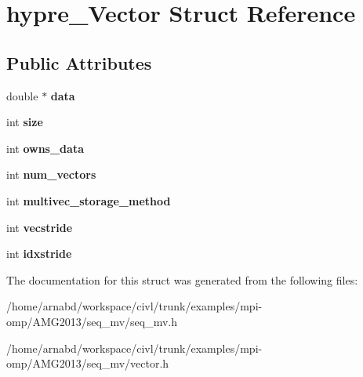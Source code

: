 \hypertarget{structhypre__Vector}{}\section{hypre\+\_\+\+Vector Struct Reference}
\label{structhypre__Vector}
\subsection*{Public Attributes}
\begin{DoxyCompactItemize}
\item 
\hypertarget{structhypre__Vector_a08359b553570ec654f152b566480a188}{}double $\ast$ {\bfseries data}\label{structhypre__Vector_a08359b553570ec654f152b566480a188}

\item 
\hypertarget{structhypre__Vector_a31794ad1f41ff2c9acd65cf14f43aa8f}{}int {\bfseries size}\label{structhypre__Vector_a31794ad1f41ff2c9acd65cf14f43aa8f}

\item 
\hypertarget{structhypre__Vector_a0e4da5f6ad56753052a5293a154dcb57}{}int {\bfseries owns\+\_\+data}\label{structhypre__Vector_a0e4da5f6ad56753052a5293a154dcb57}

\item 
\hypertarget{structhypre__Vector_aedff582cb8c2392d63996e50996921e9}{}int {\bfseries num\+\_\+vectors}\label{structhypre__Vector_aedff582cb8c2392d63996e50996921e9}

\item 
\hypertarget{structhypre__Vector_aa35fdb8b8d2227e39cb2494ab3912108}{}int {\bfseries multivec\+\_\+storage\+\_\+method}\label{structhypre__Vector_aa35fdb8b8d2227e39cb2494ab3912108}

\item 
\hypertarget{structhypre__Vector_a59e2f91987816e1b607ac68eb9d0738d}{}int {\bfseries vecstride}\label{structhypre__Vector_a59e2f91987816e1b607ac68eb9d0738d}

\item 
\hypertarget{structhypre__Vector_a4ace3ed72e95aa575a6ed4ee05b8a911}{}int {\bfseries idxstride}\label{structhypre__Vector_a4ace3ed72e95aa575a6ed4ee05b8a911}

\end{DoxyCompactItemize}


The documentation for this struct was generated from the following files\+:\begin{DoxyCompactItemize}
\item 
/home/arnabd/workspace/civl/trunk/examples/mpi-\/omp/\+A\+M\+G2013/seq\+\_\+mv/seq\+\_\+mv.\+h\item 
/home/arnabd/workspace/civl/trunk/examples/mpi-\/omp/\+A\+M\+G2013/seq\+\_\+mv/vector.\+h\end{DoxyCompactItemize}

